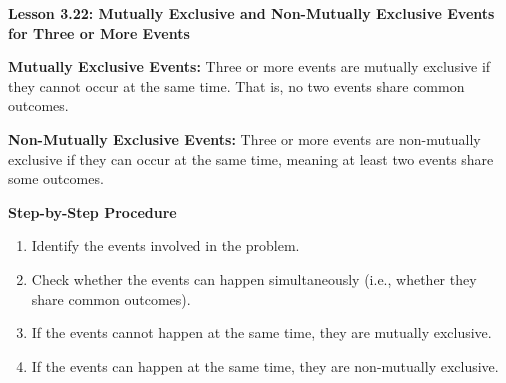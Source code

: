 \begin{center}
\textbf{Lesson 3.22: Mutually Exclusive and Non-Mutually Exclusive Events for Three or More Events}
\end{center}

\vspace*{-1.5ex}

\noindent\textbf{Mutually Exclusive Events:} Three or more events are mutually exclusive if they cannot occur at the same time. That is, no two events share common outcomes.

\noindent \textbf{Non-Mutually Exclusive Events:} Three or more events are non-mutually exclusive if they can occur at the same time, meaning at least two events share some outcomes.


\noindent\textbf{Step-by-Step Procedure}

\begin{enumerate}
    \item Identify the events involved in the problem.
    \item Check whether the events can happen simultaneously (i.e., whether they share common outcomes).
    \item If the events cannot happen at the same time, they are mutually exclusive.
    \item If the events can happen at the same time, they are non-mutually exclusive.
\end{enumerate}
